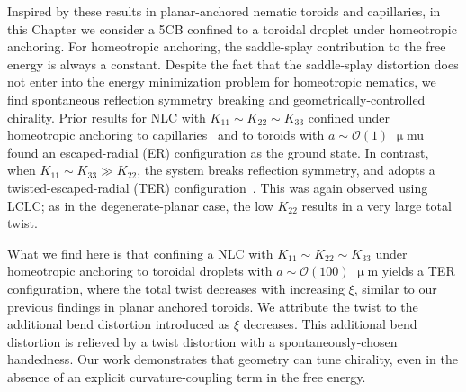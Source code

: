 Inspired by these results in planar-anchored nematic toroids and capillaries, in this Chapter we consider a 5CB confined to a toroidal droplet under homeotropic anchoring.
For homeotropic anchoring, the saddle-splay contribution to the free energy is always a constant.
Despite the fact that the saddle-splay distortion does not enter into the energy minimization problem for homeotropic nematics, we find spontaneous reflection symmetry breaking and geometrically-controlled chirality.
Prior results for NLC with $K_{11}\sim K_{22} \sim K_{33}$ confined under homeotropic anchoring to capillaries~\cite{RN179} and to toroids with $a \sim \mathcal{O}(1)$ $\upmu$mu~\cite{RN274} found an escaped-radial (ER) configuration as the ground state.
In contrast, when $K_{11}\sim K_{33} \gg K_{22}$, the system breaks reflection symmetry, and adopts a twisted-escaped-radial (TER) configuration~\cite{RN192}.
This was again observed using LCLC; as in the degenerate-planar case, the low $K_{22}$ results in a very large total twist.

What we find here is that confining a NLC with $K_{11}\sim K_{22} \sim K_{33}$ under homeotropic anchoring to toroidal droplets with $a \sim \mathcal{O}(100)$ $\upmu$m yields a TER configuration, where the total twist decreases with increasing $\xi$, similar to our previous findings in planar anchored toroids.
We attribute the twist to the additional bend distortion introduced as $\xi$ decreases.
This additional bend distortion is relieved by a twist distortion with a spontaneously-chosen handedness.
Our work demonstrates that geometry can tune chirality, even in the absence of an explicit curvature-coupling term in the free energy.


